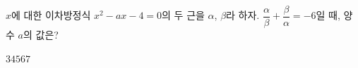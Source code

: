 $x$에 대한 이차방정식 $x^2-ax-4=0$의 두 근을 $\alpha$, $\beta$라 하자. $\dfrac{\alpha}{\beta}+\dfrac{\beta}{\alpha}=-6$일 때, 양수 $a$의 값은?
\begin{choices32}{$3$}{$4$}{$5$}{$6$}{$7$}\end{choices32}
